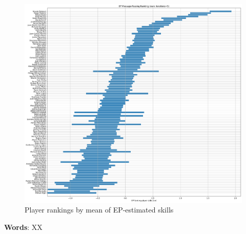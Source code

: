 \documentclass[]{article}
\begin{document}
\begin{figure}[!h]
	\centering
	\includegraphics[width=\linewidth]{ep-ranking.png}
	\caption{Player rankings by mean of EP-estimated skills}
	\label{fig:ep-ranking}
\end{figure}

\textbf{Words}: XX
\end{document}
